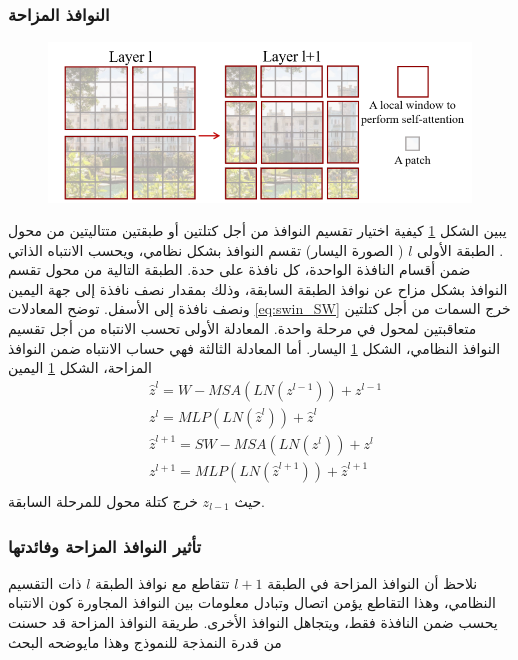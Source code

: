 \subsubsection{النوافذ المزاحة}
\begin{figure}[!h]
	\centerline{\includegraphics[width=\textwidth]{images/swin_shifted_window.png}}
	\caption{
	}
	\label{fig:swin_shifted_window}
\end{figure}
يبين الشكل
\ref{fig:swin_shifted_window}
كيفية اختيار تقسيم النوافذ من أجل كتلتين أو طبقتين متتاليتين من محول 
.
الطبقة الأولى 
$l$
( الصورة اليسار) تقسم النوافذ بشكل نظامي، ويحسب الانتباه الذاتي ضمن أقسام النافذة الواحدة، كل نافذة على حدة.
الطبقة التالية من محول 
تقسم النوافذ بشكل مزاح عن نوافذ الطبقة السابقة، وذلك بمقدار نصف نافذة إلى جهة اليمين ونصف نافذة إلى الأسفل.
توضح المعادلات 
\ref{eq:swin_SW}
 خرج السمات من أجل كتلتين متعاقبتين لمحول 
في مرحلة واحدة.
المعادلة الأولى تحسب الانتباه من أجل تقسيم النوافذ النظامي، الشكل
\ref{fig:swin_shifted_window}
 اليسار.
أما المعادلة الثالثة فهي حساب الانتباه ضمن النوافذ المزاحة، الشكل
\ref{fig:swin_shifted_window}
اليمين
\begin{equation}
	\begin{split}
	&\hat{z}^l = W-MSA(LN(z^{l-1}))+z^{l-1}\\
	&z^l = MLP(LN(\hat{z}^l))+\hat{z}^l\\
	&\hat{z}^{l+1} = SW-MSA(LN(z^l))+z^l\\
	&z^{l+1} = MLP(LN(\hat{z}^{l+1}))+\hat{z}^{l+1}\\
	\end{split}
	\label{eq:swin_SW}
\end{equation}
حيث 
$z_{l-1}$
خرج كتلة محول 
للمرحلة السابقة.
\subsubsection{تأثير النوافذ المزاحة وفائدتها}
نلاحظ أن النوافذ المزاحة في الطبقة 
$l+1$
تتقاطع مع نوافذ الطبقة 
$l$
ذات التقسيم النظامي، وهذا التقاطع يؤمن اتصال وتبادل معلومات بين النوافذ المجاورة كون الانتباه يحسب ضمن النافذة فقط، ويتجاهل النوافذ الأخرى.
طريقة النوافذ المزاحة قد حسنت من قدرة النمذجة للنموذج وهذا مايوضحه البحث 
